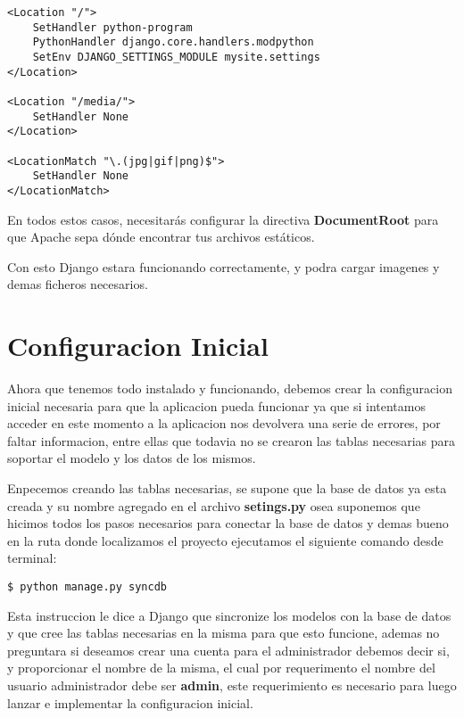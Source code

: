 \begin{lstlisting}[style=consola]
<Location "/">
    SetHandler python-program
    PythonHandler django.core.handlers.modpython
    SetEnv DJANGO_SETTINGS_MODULE mysite.settings
</Location>

<Location "/media/">
    SetHandler None
</Location>

<LocationMatch "\.(jpg|gif|png)$">
    SetHandler None
</LocationMatch>
\end{lstlisting}
\vspace{0.1cm}

En todos estos casos, necesitarás configurar la directiva \textbf{DocumentRoot}
para que Apache sepa dónde encontrar tus archivos estáticos.

Con esto Django estara funcionando correctamente, y podra cargar imagenes y demas
ficheros necesarios.


\section{Configuracion Inicial}

Ahora que tenemos todo instalado y funcionando, debemos crear la configuracion
inicial necesaria para que la aplicacion pueda funcionar ya que si intentamos
acceder en este momento a la aplicacion nos devolvera una serie de errores, por
faltar informacion, entre ellas que todavia no se crearon las tablas necesarias
para soportar el modelo y los datos de los mismos.

Enpecemos creando las tablas necesarias, se supone que la base de datos ya esta
creada y su nombre agregado en el archivo \textbf{setings.py} osea suponemos
que hicimos todos los pasos necesarios para conectar la base de datos y demas
bueno en la ruta donde localizamos el proyecto ejecutamos el siguiente comando
desde terminal:

\begin{lstlisting}[style=consola]
$ python manage.py syncdb
\end{lstlisting}

Esta instruccion le dice a Django que sincronize los modelos con la base de datos
y que cree las tablas necesarias en la misma para que esto funcione, ademas
no preguntara si deseamos crear una cuenta para el administrador debemos decir si,
y proporcionar el nombre de la misma, el cual por requerimento el nombre del
usuario administrador debe ser \textbf{admin}, este requerimiento es necesario
para luego lanzar e implementar la configuracion inicial.

